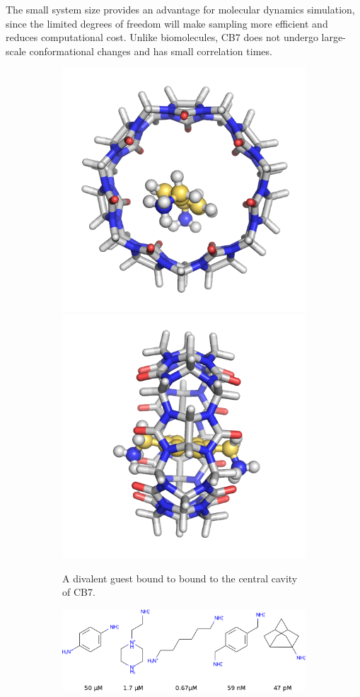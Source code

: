 \documentclass[10pt,final]{article}
\begin{document}
The small system size provides an advantage for molecular dynamics simulation, since the limited degrees of freedom will make sampling more efficient and reduces computational cost.
%
Unlike biomolecules, CB7 does not undergo large-scale conformational changes and has small correlation times.

\begin{figure}[H]
\centering
\begin{subfigure}{.5\textwidth}
  \centering
  \includegraphics[width=.4\linewidth]{figures/guest11_top.png}
  \includegraphics[width=.4\linewidth]{figures/guest11_side.png}
  \caption{A divalent guest bound to bound to the central cavity of CB7.}
  \label{fig:sub1}
\end{subfigure}%
\begin{subfigure}{.5\textwidth}
  \centering
  \includegraphics[width=1\linewidth]{figures/Kd_guest2.png}  

\end{subfigure}
\end{figure}
\end{document}
